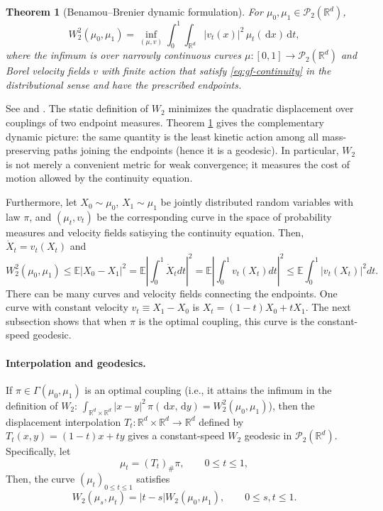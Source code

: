 \documentclass[11pt]{amsart}
\numberwithin{equation}{section}
\theoremstyle{plain}
\newtheorem{theorem}{Theorem}[section]
\newcommand{\R}{\mathbb{R}}
\newcommand{\E}{\mathbb{E}}
\newcommand{\cP}{\mathcal{P}}
\newcommand{\dd}{\,\mathrm{d}}
\newcommand{\abs}[1]{\left\lvert#1\right\rvert}
\begin{document}
\begin{theorem}[Benamou--Brenier dynamic formulation]
\label{thm:benamou-brenier}
For $\mu_0,\mu_1\in\cP_2(\R^d)$,
\begin{equation}\label{eq:benamou-brenier}
 W_2^2(\mu_0,\mu_1)
 =\inf_{(\mu,v)}
   \int_0^1\int_{\R^d}\abs{v_t(x)}^2\,\mu_t(\dd x)\dd t,
\end{equation}
where the infimum is over narrowly continuous curves
$\mu:[0,1]\to\cP_2(\R^d)$ and Borel velocity fields $v$ with finite action
that satisfy \eqref{eq:gf-continuity} in the distributional sense and have
the prescribed endpoints.
\end{theorem}

See \cite{BenamouBrenier2000} and
\cite[Chapter~7]{Villani2009}.  The static definition of $W_2$ minimizes the
quadratic displacement over couplings of two endpoint measures.  Theorem
\ref{thm:benamou-brenier} gives the complementary dynamic picture: the same quantity is the least kinetic action among all mass-preserving paths joining the endpoints (hence it is a geodesic). 
 In particular, $W_2$ is not merely a convenient metric for
weak convergence; it measures the cost of motion allowed by the continuity
equation.

Furthermore, let $X_0\sim\mu_0$, $X_1\sim\mu_1$ be jointly distributed random variables with law $\pi$, and $(\mu_t,v_t)$ be the corresponding curve in the space of probability measures and velocity fields satisying the continuity equation. Then, $\dot X_t = v_t(X_t)$ and 
\[
 W_2^2(\mu_0,\mu_1)
 \leq\E\abs{X_0-X_1}^2 = \E |\int_0^1 \dot X_tdt|^2  
 = \E |\int_0^1 v_t(X_t)dt|^2
 \leq \E \int_0^1 |v_t(X_t)|^2 dt.  
\]
There can be many curves and velocity fields connecting the endpoints. One curve with constant velocity $v_t \equiv X_1 - X_0$ is $X_t = (1-t)X_0 + tX_1$. The next subsection shows that when $\pi$ is the optimal coupling, this curve is the constant-speed geodesic. 


\vspace{2mm}
\paragraph{\textbf{Interpolation and geodesics.}}
If $\pi\in \Gamma(\mu_0,\mu_1)$ is an optimal coupling (i.e., it attains the infimum in the definition of $W_2$: $\int_{\R^d\times\R^d}|x-y|^2\,\pi(\dd x,\dd y)
 =W_2^2(\mu_0,\mu_1)$), then the displacement interpolation
$T_t:\R^d\times\R^d\to\R^d$ defined by $T_t(x,y)=(1-t)x+ty$ gives a constant-speed $W_2$ geodesic in $\cP_2(\R^d)$. Specifically, let
\begin{equation}\label{eq:displacement-interpolation}
 \mu_t=(T_t)_\#\pi,
 \qquad 0\leq t\leq1,
\end{equation}
Then, the curve $(\mu_t)_{0\leq t\leq1}$ satisfies
\[
 W_2(\mu_s,\mu_t)=|t-s|W_2(\mu_0,\mu_1),
 \qquad 0\leq s,t\leq1.
\]
\end{document}
